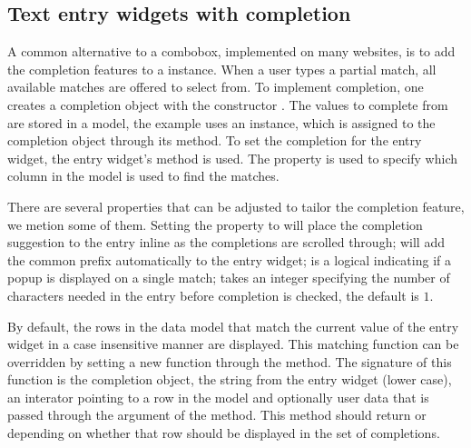 \subsection{Text entry widgets with completion}
\label{sec:RGtk2:entry-completion}

A common alternative to a combobox, implemented on many websites, is to add the completion features to a
 instance. When a user types a partial match,
all available matches are offered to select from. To implement completion, one creates
a completion object with the constructor
. The values to complete from are
stored in a model, the example uses an  instance,
which is assigned to the completion object through its
 method. To set the completion
for the entry widget, the entry widget's
 method is used. The
 property is used to specify which column in
the model is used to find the matches.


There are several properties that can be adjusted to tailor the
completion feature, we metion some of them. Setting the property
 to  will place the completion
suggestion to the entry inline as the completions are scrolled
through;  will add the common prefix
automatically to the entry widget;  is a
logical indicating if a popup is displayed on a single match;
 takes an integer specifying the number of
characters needed in the entry before completion is checked, the
default is $1$.

By default, the rows in the data model that match the
current value of the entry widget in a case insensitive manner are displayed. This
matching function can be overridden by setting a new function through
the  method. The signature of
this function is the completion object, the string from the entry
widget (lower case), an interator pointing to a row in the model and optionally
user data that is passed through the  argument of the
 method. This method should return  or
 depending on whether that row should be displayed in the
set of completions.


